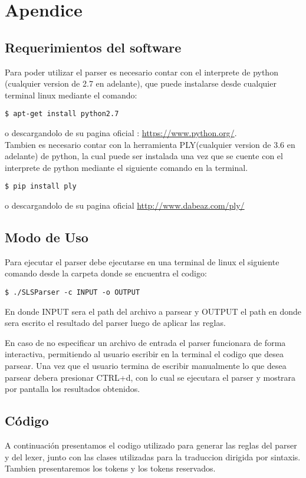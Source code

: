\section{Apendice}

\subsection{Requerimientos del software}
Para poder utilizar el parser es necesario contar con el interprete de python
(cualquier version de 2.7 en adelante), que puede instalarse desde cualquier
terminal linux mediante el comando:

\begin{verbatim}
$ apt-get install python2.7
\end{verbatim}

o descargandolo de su pagina oficial : \url{https://www.python.org/}. \\
Tambien es necesario contar con la herramienta PLY(cualquier version de 3.6 en
adelante) de python, la cual puede ser
instalada una vez que se cuente con el interprete de python mediante el siguiente comando en la terminal.
\begin{verbatim}
$ pip install ply
\end{verbatim}
o descargandolo de su pagina oficial \url{http://www.dabeaz.com/ply/}

\subsection{Modo de Uso}
Para ejecutar el parser debe ejecutarse en una terminal de linux el siguiente
comando desde la carpeta donde se encuentra el codigo:
\begin{verbatim}
$ ./SLSParser -c INPUT -o OUTPUT
\end{verbatim}


En donde INPUT sera el path del archivo a parsear y OUTPUT el path en donde
sera escrito el resultado del parser luego de aplicar las reglas.

En caso de no
especificar un archivo de entrada el parser funcionara de forma interactiva,
permitiendo al usuario escribir en la terminal el codigo que desea parsear. Una
vez que el usuario termina de escribir manualmente lo que desea parsear debera
presionar CTRL+d, con lo cual se ejecutara el parser y mostrara por pantalla
los resultados obtenidos.

\subsection{Código}
A continuación presentamos el codigo utilizado para generar las reglas del
parser y del lexer, junto con las clases utilizadas para
la traduccion dirigida por sintaxis. Tambien presentaremos los tokens y los
tokens reservados.
